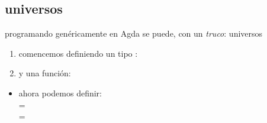 \documentclass[9pt]{beamer}
\newcommand{\saltar}{\vspace{1ex}}
\begin{document}
\subsection{universos}

\begin{frame}{programando gen\'ericamente}
  en Agda se puede, con un \emph{truco}: \alert{universos}
  \pause
  \begin{enumerate}
    \item comencemos definiendo un tipo :\\ \saltar
      \pause
    \item y una función:\\ \saltar
      \pause
  \end{enumerate}
  \begin{itemize}
    \item ahora podemos definir: \\ \saltar
       \pause
      \hspace{5ex} \hspace{0.9ex}   = \\
      \hspace{5ex}  = 
  \end{itemize}
\end{frame}


{
\begin{frame}[plain]
\end{frame}
}
\end{document}

